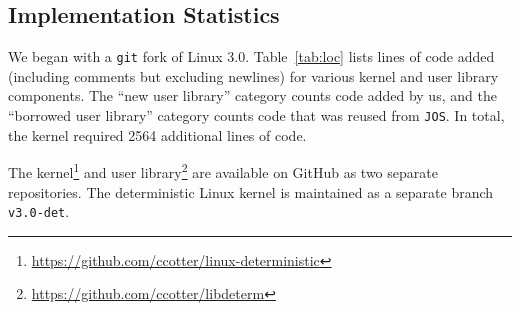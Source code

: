 \subsection{Implementation Statistics}
We began with a {\tt git} fork of Linux 3.0. \mbox{Table \ref{tab:loc}} lists lines
of code added (including comments but excluding newlines) for various kernel and
user library components. The ``new user library'' category counts code added by
us, and the ``borrowed user library'' category counts code that was reused from
{\tt JOS}. In total, the kernel required 2564 additional lines of code.



The kernel\footnote{
\url{https://github.com/ccotter/linux-deterministic}} and user
library\footnote{\url{https://github.com/ccotter/libdeterm}} are available on
GitHub as two separate repositories. The deterministic Linux kernel
is maintained as a separate branch {\tt v3.0-det}.

\endinput


